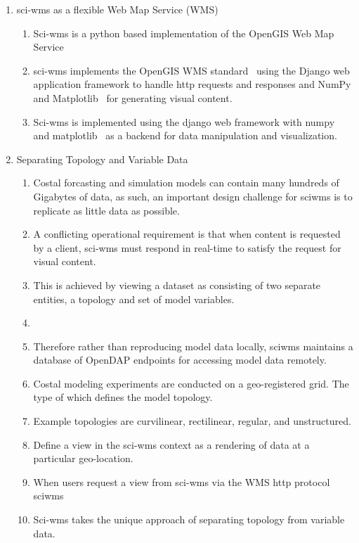 \documentclass{article}
\begin{document}
\begin{enumerate}
  \item sci-wms as a flexible Web Map Service (WMS)
    \begin{enumerate}[label*=\arabic*.]
      \item Sci-wms is a python based implementation of the OpenGIS Web Map Service~\cite{wms14}
      \item sci-wms implements the OpenGIS WMS standard~\cite{wms14}
        using the Django web application framework to handle http
        requests and responses and NumPy and
        Matplotlib~\cite{numpy11,hunter07} for generating visual content.
      \item Sci-wms is implemented using the django web framework with
        numpy~\cite{numpy11} and matplotlib~\cite{hunter07} as a backend for data manipulation and
        visualization.
    \end{enumerate}

    \item Separating Topology and Variable Data
      \begin{enumerate}[label*=\arabic*.]
        \item Costal forcasting and simulation models can contain many
          hundreds of Gigabytes of data, as such, an important design
          challenge for sciwms is to replicate as little data as
          possible.
        \item A conflicting operational requirement is that when
          content is requested by a client, sci-wms must respond in
          real-time to satisfy the request for visual content.
        \item This is achieved by viewing a dataset as consisting of
          two separate entities, a topology and set of model variables.
        \item 
        \item Therefore rather than reproducing model data locally,
          sciwms maintains a database of OpenDAP endpoints for
          accessing model data remotely.
       
        \item Costal modeling experiments are conducted on a
          geo-registered grid. The type of which defines the model
          topology.
        \item Example topologies are curvilinear, rectilinear, regular, and unstructured.
        \item Define a view in the sci-wms context as a rendering of data at a particular geo-location.
        \item When users request a view from sci-wms via the WMS http protocol sciwms
        \item Sci-wms takes the unique approach of separating topology from variable data.


\end{enumerate}
\end{enumerate}
\end{document}
